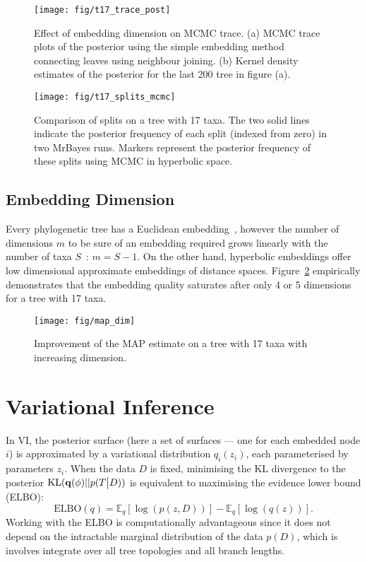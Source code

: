 \documentclass[11pt, twocolumn]{article}
\newcommand{\be}{\begin{equation*}}
\newcommand{\ee}{\end{equation*}}
\begin{document}
\begin{figure}[htbp]
\begin{center}
    \texttt{[image: fig/t17\_trace\_post]}
\end{center}
\caption{Effect of embedding dimension on MCMC trace. (a) MCMC trace plots of the posterior using the simple embedding method connecting leaves using neighbour joining.
(b) Kernel density estimates of the posterior for the last 200 tree in figure (a).}
\end{figure}

\begin{figure}[htbp] \label{fig:splits}
    \begin{center}
        \texttt{[image: fig/t17\_splits\_mcmc]}
    \end{center}
    \caption{Comparison of splits on a tree with 17 taxa.
    The two solid lines indicate the posterior frequency of each split (indexed from zero) in two MrBayes runs.
    Markers represent the posterior frequency of these splits using MCMC in hyperbolic space.}
    \end{figure}

\subsection{Embedding Dimension}
Every phylogenetic tree has a Euclidean embedding~\cite{devienne2011euclidean}, however the number of dimensions $m$ to be sure of an embedding required grows linearly with the number of taxa $S$~\cite{deza1997geometry}: $m=S-1$.
On the other hand, hyperbolic embeddings offer low dimensional approximate embeddings of distance spaces.
Figure~\ref{fig:map_dim} empirically demonstrates that the embedding quality saturates after only 4 or 5 dimensions for a tree with 17 taxa.

\begin{figure}[htbp] \label{fig:map_dim}
\begin{center}
    \texttt{[image: fig/map\_dim]}
\end{center}
\caption{Improvement of the MAP estimate on a tree with 17 taxa with increasing dimension.}
\end{figure}

\section{Variational Inference}
In VI, the posterior surface (here a set of surfaces --- one for each embedded node $i$) is approximated by a variational distribution $q_{i}(z_{i})$, each parameterised by parameters $z_{i}$.
When the data $D$ is fixed, minimising the KL divergence to the posterior $\text{KL}({\bf q}(\phi)||p(T\big|D))$ is equivalent to maximising the evidence lower bound (ELBO):
\be
\text{ELBO}(q) = \mathbb{E}_{q}[\log(p(z,D))] - \mathbb{E}_{q}[\log(q(z))].
\ee
Working with the ELBO is computationally advantageous since it does not depend on the intractable marginal distribution of the data $p(D)$, which is involves integrate over all tree topologies and all branch lengths.
\end{document}
